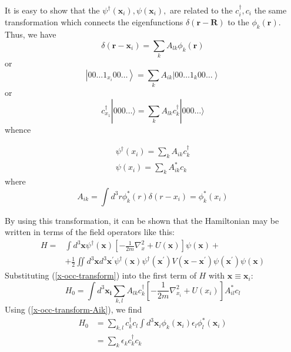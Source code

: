 It is easy to show that the $\psi^{\dagger}\left(\mathbf{x}_{i}\right), \psi\left(\mathbf{x}_{i}\right),$ are related to the $c_{i}^{\dagger}, c_{i}$ the same transformation which connects the eigenfunctions $\delta(\mathbf{r-R})$ to the $\phi_k(\mathbf{r})$. Thus, we have
$$\delta\left(\mathbf{r}-\mathbf{x}_{i}\right)=\sum_{k} A_{l k} \phi_{k}(\mathbf{r})$$
or
$$\left|00 \ldots 1_{x_{i}} 00 \ldots\right\rangle=\sum_{k} A_{i k}\left|00 \ldots 1_{k} 00 \ldots\right\rangle$$
or
$$c_{x_{1}}^{\dagger}|000 \ldots\rangle=\sum_{k} A_{l k} c_{k}^{\dagger}|000 \ldots\rangle$$
whence
\begin{imp}
\begin{equation}\begin{array}{l}
\psi^{\dagger}\left(x_{i}\right)=\sum_{k} A_{i k} c_{k}^{\dagger} \\
\psi\left(x_{i}\right)=\sum_{k} A_{i k}^{*} c_{k}
\end{array}
\label{x-occ-transform}
\end{equation}
where
\begin{equation}
    A_{i k}=\int d^{3} r \phi_{k}^{*}(r) \delta\left(r-x_{i}\right)=\phi_{k}^{*}\left(x_{i}\right)
\label{x-occ-transform-Aik}
\end{equation}
\end{imp}
By using this transformation, it can be shown that the Hamiltonian may be written in terms of the field operators like this:
$$\begin{aligned}
H=& \int d^{3} \mathbf{x} \psi^{\dagger}(\mathbf{x})\left[-\frac{1}{2 m} \nabla_{x}^{2}+U(\mathbf{x})\right] \psi(\mathbf{x})+\\
&+\frac{1}{2} \iint d^{3} \mathbf{x} d^{3} \mathbf{x}^{\prime} \psi^{\dagger}(\mathbf{x}) \psi^{\dagger}\left(\mathbf{x}^{\prime}\right) V\left(\mathbf{x}-\mathbf{x}^{\prime}\right) \psi\left(\mathbf{x}^{\prime}\right) \psi(\mathbf{x})
\end{aligned}$$
Substituting (\ref{x-occ-transform}) into the first term of $H$ with $\mathbf{x}\equiv\mathbf{x}_i$:
$$H_{0}=\int d^{3} \mathbf{x_{i}} \sum_{k, l} A_{l k} c_{k}^{\dagger}\left[-\frac{1}{2 m} \nabla_{x_{i}}^{2}+U\left(x_{i}\right)\right] A_{i l}^{*} c_{l}$$
Using (\ref{x-occ-transform-Aik}), we find
$$\begin{aligned}
H_{0} &=\sum_{k, l} c_{k}^{\dagger} c_{l} \int d^{3} \mathbf{x}_{i} \phi_{k}\left(\mathbf{x}_{i}\right) \epsilon_{l} \phi_{l}^{*}\left(\mathbf{x}_{i}\right) \\
&=\sum_{k} \epsilon_{k} c_{k}^{\dagger} c_{k}
\end{aligned}$$

